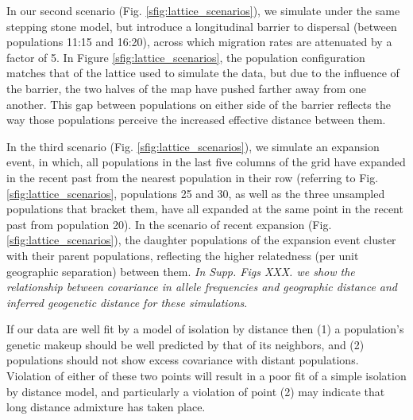 \documentclass[12pt]{article}
\newcommand{\gc}[1]{{\em \color{blue} #1}}
\begin{document}
In our second scenario (Fig. \ref{sfig:lattice_scenarios}), we simulate under the same stepping stone model, but introduce a longitudinal barrier to dispersal (between populations 11:15 and 16:20), across which migration rates are attenuated by a factor of 5.  In Figure \ref{sfig:lattice_scenarios}, the population configuration matches that of the lattice used to simulate the data, but due to the influence of the barrier, the two halves of the map have pushed farther away from one another.  This gap between populations on either side of the barrier reflects the way those populations perceive the increased effective distance between them.

In the third scenario (Fig. \ref{sfig:lattice_scenarios}), we simulate an expansion event, in which, all populations in the last five columns of the grid have expanded in the recent past from the nearest population in their row (referring to Fig. \ref{sfig:lattice_scenarios}, populations 25 and 30, as well as the three unsampled populations that bracket them, have all expanded at the same point in the recent past from population 20). In the scenario of recent expansion (Fig. \ref{sfig:lattice_scenarios}), the daughter populations of the expansion event cluster with their parent populations, reflecting the higher relatedness (per unit geographic separation) between them.  \gc{In Supp. Figs XXX. we show the relationship between covariance in allele frequencies and geographic distance and inferred geogenetic distance for these simulations}.

If our data are well fit by a model of isolation by distance then (1) a population's genetic makeup should be well predicted by that of its neighbors, and (2) populations should not show excess covariance with distant populations. Violation of either of these two points will result in a poor fit of a simple isolation by distance model, and particularly a violation of point (2) may indicate that long distance admixture has taken place.
\end{document}
